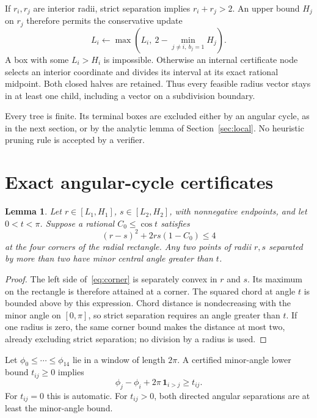 \documentclass[11pt]{amsart}
\newtheorem{lemma}[theorem]{Lemma}
\theoremstyle{definition}
\theoremstyle{remark}
\numberwithin{equation}{section}
\begin{document}
If $r_i,r_j$ are interior radii, strict separation implies $r_i+r_j>2$.
An upper bound $H_j$ on $r_j$ therefore permits the conservative update
\begin{equation}\label{eq:propagate}
 L_i\gets\max\left(L_i,\ 2-\min_{j\ne i,\ b_j=1}H_j\right).
\end{equation}
A box with some $L_i>H_i$ is impossible. Otherwise an internal certificate
node selects an interior coordinate and divides its interval at its exact
rational midpoint. Both closed halves are retained. Thus every feasible
radius vector stays in at least one child, including a vector on a
subdivision boundary.

Every tree is finite. Its terminal boxes are excluded either by an angular
cycle, as in the next section, or by the analytic lemma of
Section~\ref{sec:local}. No heuristic pruning rule is accepted by a verifier.

\section{Exact angular-cycle certificates}\label{sec:cycles}

\begin{lemma}\label{lem:corner}
Let $r\in[L_1,H_1]$, $s\in[L_2,H_2]$, with nonnegative endpoints, and let
$0<t<\pi$. Suppose a rational $C_0\leq\cos t$ satisfies
\begin{equation}\label{eq:corner}
 (r-s)^2+2rs(1-C_0)\leq4
\end{equation}
at the four corners of the radial rectangle. Any two points of radii $r,s$
separated by more than two have minor central angle greater than $t$.
\end{lemma}
\begin{proof}
The left side of~\eqref{eq:corner} is separately convex in $r$ and $s$.
Its maximum on the rectangle is therefore attained at a corner. The squared
chord at angle $t$ is bounded above by this expression. Chord distance is
nondecreasing with the minor angle on $[0,\pi]$, so strict separation
requires an angle greater than $t$. If one radius is zero, the same corner
bound makes the distance at most two, already excluding strict separation;
no division by a radius is used.
\end{proof}

Let $\phi_0\leq\cdots\leq\phi_{14}$ lie in a window of length $2\pi$.
A certified minor-angle lower bound $t_{ij}\geq0$ implies
\begin{equation}\label{eq:edge}
 \phi_j-\phi_i+2\pi\,\boldsymbol1_{i>j}\geq t_{ij}.
\end{equation}
For $t_{ij}=0$ this is automatic. For $t_{ij}>0$, both directed angular
separations are at least the minor-angle bound.
\end{document}
